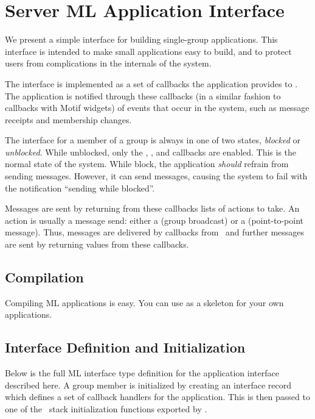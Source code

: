 \section{Server ML Application Interface}
\label{section:applintf}

We present a simple interface for building single-group applications.  This
interface is intended to make small applications easy to build, and to protect
users from complications in the internals of the system.

The interface is implemented as a set of callbacks the application
provides to \ensemble.  The application is notified through these
callbacks (in a similar fashion to callbacks with Motif widgets) of
events that occur in the system, such as message receipts and
membership changes.

The interface for a member of a group is always in one of two states,
\emph{blocked} or \emph{unblocked}.  While unblocked, only the
, , and 
callbacks are enabled.  This is the normal state of the system. While
block, the application \emph{should} refrain from sending messages. However,
it can send messages, causing the system to fail with the notification
``sending while blocked''.

Messages are sent by returning from these callbacks lists of actions to
take.  An action is usually a message send: either a  (group
broadcast) or a  (point-to-point message).  Thus, messages are
delivered by callbacks from \ensemble\ and further messages are sent by
returning values from these callbacks.

\subsection{Compilation}
Compiling ML applications is easy.  You can use  as a
skeleton for your own applications.

\subsection{Interface Definition and Initialization}
Below is the full ML interface type definition for the application
interface described here.  A group member is initialized by creating
an interface record which defines a set of callback handlers for the
application.  This is then passed to one of the \ensemble\ stack
initialization functions exported by .

